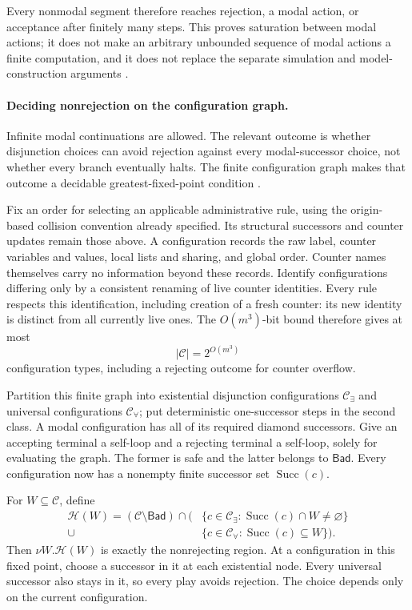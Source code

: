 Every nonmodal segment therefore reaches rejection, a modal action,
or acceptance after finitely many steps. This proves saturation
between modal actions; it does not make an arbitrary unbounded
sequence of modal actions a finite computation, and it does not
replace the separate simulation and model-construction arguments
\cite[lemmas~6.2.6--6.2.7, pp.~345--346]{Kozen1983}.

\paragraph{Deciding nonrejection on the configuration graph.}
Infinite modal continuations are allowed. The relevant
outcome is whether disjunction choices can avoid
rejection against every modal-successor choice,
not whether every branch eventually halts.
The finite configuration graph makes that outcome
a decidable greatest-fixed-point condition
\cite[\S6.2 and thm.~6.3.1]{Kozen1983}.

Fix an order for selecting an applicable administrative
rule, using the origin-based collision convention
already specified. Its structural successors and counter
updates remain those above. A configuration records
the raw label, counter variables and values, local
lists and sharing, and global order. Counter names
themselves carry no information beyond these records.
Identify configurations differing only by a consistent
renaming of live counter identities. Every rule
respects this identification, including creation of
a fresh counter: its new identity is distinct from
all currently live ones.
The \(O(m^3)\)-bit bound therefore gives at most
\[
 |\mathcal C|=2^{O(m^3)}
\]
configuration types, including a rejecting outcome
for counter overflow.

Partition this finite graph into existential
disjunction configurations \(\mathcal C_\exists\)
and universal configurations \(\mathcal C_\forall\);
put deterministic one-successor steps in the
second class. A modal configuration has all of
its required diamond successors. Give an accepting
terminal a self-loop and a rejecting terminal
a self-loop, solely for evaluating the graph.
The former is safe and the latter belongs to
\(\mathsf{Bad}\). Every configuration now has a
nonempty finite successor set
\(\operatorname{Succ}(c)\).

For \(W\subseteq\mathcal C\), define
\[
\begin{split}
 \mathcal H(W)=(\mathcal C\setminus\mathsf{Bad})\cap
 \bigl(&\{c\in\mathcal C_\exists:
                   \operatorname{Succ}(c)\cap W\ne\varnothing\}\\
       {}\cup&
       \{c\in\mathcal C_\forall:
                   \operatorname{Succ}(c)\subseteq W\}\bigr).
\end{split}
\]
Then \(\nu W.\mathcal H(W)\) is exactly the
nonrejecting region. At a configuration in this
fixed point, choose a successor in it at each
existential node. Every universal successor also
stays in it, so every play avoids rejection.
The choice depends only on the current configuration.

